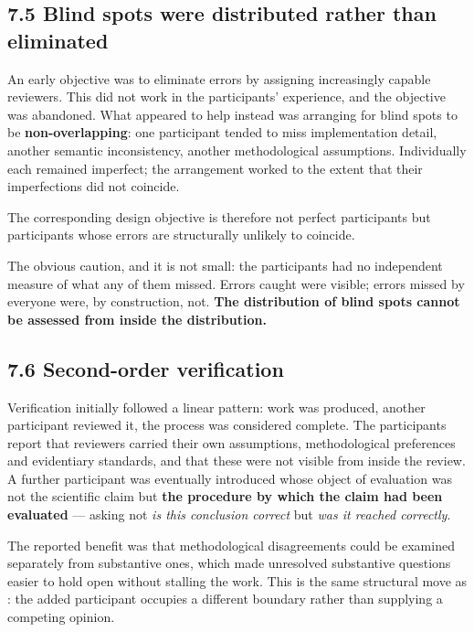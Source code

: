 \subsection*{7.5 Blind spots were distributed rather than eliminated}
\label{sec:en:7.5}

An early objective was to eliminate errors by assigning increasingly capable reviewers. This did not work in the participants' experience, and the objective was abandoned. What appeared to help instead was arranging for blind spots to be \textbf{non-overlapping}: one participant tended to miss implementation detail, another semantic inconsistency, another methodological assumptions. Individually each remained imperfect; the arrangement worked to the extent that their imperfections did not coincide.

The corresponding design objective is therefore not perfect participants but participants whose errors are structurally unlikely to coincide.

The obvious caution, and it is not small: the participants had no independent measure of what any of them missed. Errors caught were visible; errors missed by everyone were, by construction, not. \textbf{The distribution of blind spots cannot be assessed from inside the distribution.}


\subsection*{7.6 Second-order verification}
\label{sec:en:7.6}

Verification initially followed a linear pattern: work was produced, another participant reviewed it, the process was considered complete. The participants report that reviewers carried their own assumptions, methodological preferences and evidentiary standards, and that these were not visible from inside the review. A further participant was eventually introduced whose object of evaluation was not the scientific claim but \textbf{the procedure by which the claim had been evaluated} — asking not \emph{is this conclusion correct} but \emph{was it reached correctly}.

The reported benefit was that methodological disagreements could be examined separately from substantive ones, which made unresolved substantive questions easier to hold open without stalling the work. This is the same structural move as : the added participant occupies a different boundary rather than supplying a competing opinion.


